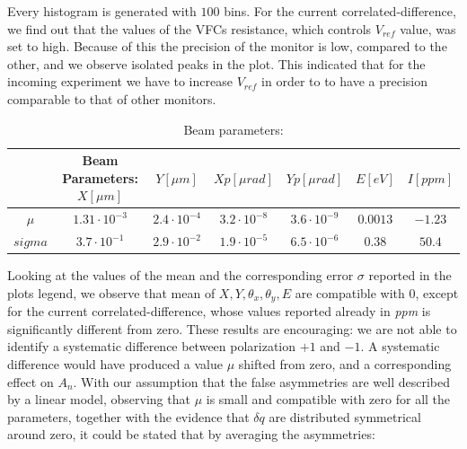 \begin{figure}[hbtp]
\end{figure}

Every histogram is generated with $100$ bins. For the current correlated-difference, we find out that the values of the VFCs resistance, which controls $V_{ref}$ value, was set to high. Because of this the precision of the monitor is low, compared to the other, and we observe isolated peaks in the plot. This indicated that for the incoming experiment we have to increase $V_{ref}$ in order to to have a precision comparable to that of other monitors. 


\begin{table}[hbtp]
\centering
\caption{Beam parameters:}
\begin{tabular}{c|c|c|c|c|c|c} 
\hline 
\rule[-1ex]{0pt}{2.5ex} & Beam Parameters: $X [\mu m]$ & $Y[\mu m]$ & $Xp [\mu rad]$ & $Yp [\mu rad]$ & $E [eV]$ & $I [ppm] $ \\ 
\hline 
\rule[-1ex]{0pt}{2.5ex} $\mu$ & $1.31 \cdot 10^{-3}$ & $2.4 \cdot 10^{-4}$ & $3.2 \cdot 10^{-8} $ & $3.6 \cdot 10^{-9}$ & $0.0013$ & $-1.23$ \\ 
\hline 
\rule[-1ex]{0pt}{2.5ex} $sigma$ & $3.7 \cdot 10^{-1}$ & $2.9 \cdot 10^{-2}$ & $ 1.9 \cdot 10^{-5} $ & $6.5 \cdot 10^{-6}$ & $0.38$  & $50.4$ \\ 
\hline 
\end{tabular}
\label{Tab:parametri} 
\end{table}


Looking at the values of the mean and the corresponding error $\sigma$ reported in the plots legend, we observe that mean of $X,Y,\theta_{x},\theta_{y},E$ are compatible with $0$, except for the current correlated-difference, whose values reported already in \textit{ppm} is significantly different from zero. These results are encouraging: we are not able to identify a systematic difference between polarization $+1$ and $-1$. A systematic difference would have produced a value $\mu$ shifted from zero, and a corresponding effect on $A_{n}$. 
With our assumption that the false asymmetries are well described by a linear model, observing that $\mu$ is small and compatible with zero for all the parameters, together with the evidence that $\delta q$ are distributed symmetrical around zero, it could be stated that by averaging the asymmetries:

